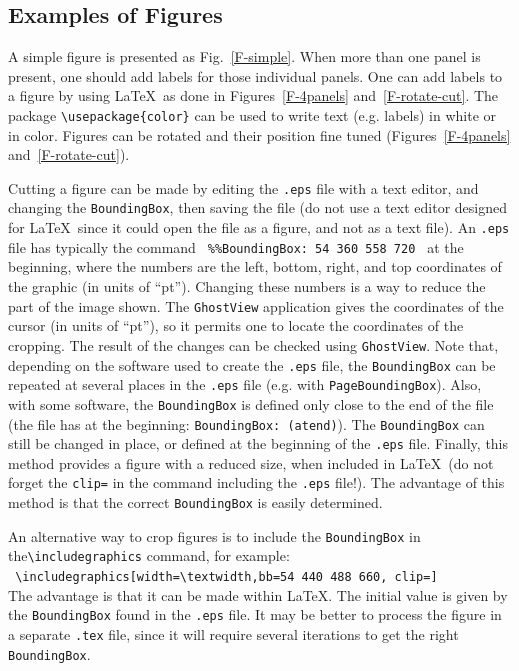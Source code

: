 \documentclass[namedreferences,hyperref,optionalrh]{spr-sola}
\begin{document}
\subsection{Examples of Figures} %
\label{S-figures}
 A simple figure is presented as Fig.~\ref{F-simple}. When more
than one panel is present, one should add labels for those individual panels.
One can add labels to a figure by using \LaTeX\ as done
in Figures~\ref{F-4panels} and~\ref{F-rotate-cut}. 
The package \verb+\usepackage{color}+
can be used to write text (e.g. labels) in white or in color. 
Figures can be rotated and their position fine tuned 
(Figures~\ref{F-4panels} and~\ref{F-rotate-cut}).

  Cutting a figure can be made by editing the \texttt{.eps} 
file with a text editor, and changing the \texttt{BoundingBox}, 
then saving the file (do not use a text editor designed for \LaTeX\ since 
it could open the file as a figure, and not as a text file).
An \texttt{.eps} file has typically the command
\verb+ %%BoundingBox: 54 360 558 720 + 
at the beginning, where the numbers are the left, bottom, right, and top
coordinates of the graphic (in units of ``pt'').  
Changing these numbers is a way to reduce the part of the image shown. 
The \texttt{GhostView} application gives the coordinates
of the cursor (in units of ``pt''), so it permits one to locate the 
coordinates of the cropping. 
The result of the changes can be checked using \texttt{GhostView}. 
 Note that, depending on the software used to create the \texttt{.eps} file, 
the \texttt{BoundingBox} can be repeated at several places in the
\texttt{.eps} file (e.g. with \texttt{PageBoundingBox}). 
Also, with some software,
the \texttt{BoundingBox} is defined only close to the end of the file
(the file has at the beginning: \texttt{BoundingBox: (atend)}).
The \texttt{BoundingBox} can still be changed
in place, or defined at the beginning of the \texttt{.eps} file. 
   Finally, this method provides a figure with a reduced size, when
included in \LaTeX\ (do not forget the \texttt{clip=} 
in the command including the \texttt{.eps} file!).     
The advantage of this method is that the correct \texttt{BoundingBox}
is easily determined.

   An alternative way to crop figures is to include the \texttt{BoundingBox}
in the\linebreak \verb+\includegraphics+ command, for example:\\
\verb+ \includegraphics[width=\textwidth,bb=54 440 488 660, clip=]+ \\
  The advantage
is that it can be made within \LaTeX . The initial value is given
by the \texttt{BoundingBox} found in the \texttt{.eps} file.
It may be better to process the
figure in a separate \texttt{.tex} file, since it will require several 
iterations to get the right \texttt{BoundingBox}.
   
\end{document}

